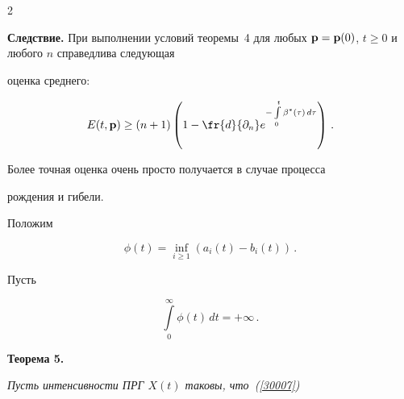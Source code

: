 \begin{multicols}{2}
\bigskip





\noindent


{\bf Следствие.} При выполнении условий теоремы~4 для любых ${\bf


p}= {\bf p}(0)$, $t \ge 0$ и любого $n$ справедлива следующая


оценка среднего:


\begin{equation*}


 E(t,{\bf p}) \ge


 \left(n+1\right)\left(1-\fr{d}{{\partial}_n }e^{-\int\limits_0^t  \beta^* (\tau)\,


d\tau} \right)\,. 




\end{equation*}





\bigskip


Более точная оценка очень просто получается в случае процесса


рождения и гибели.





Положим


\begin{equation*}


\phi (t) = \inf_{ i \ge 1} \left(a_i(t) - b_i(t)\right)\,.




\end{equation*}





Пусть


\begin{equation}


\int\limits_0^{\infty} \phi (t)\, dt = +\infty \,. 


\label{30007}


\end{equation}





\bigskip





\noindent


{\bf Теорема 5.} {\it  Пусть интенсивности ПРГ  $X(t)$ таковы, что~(\ref{30007}) 


}
\end{multicols}
